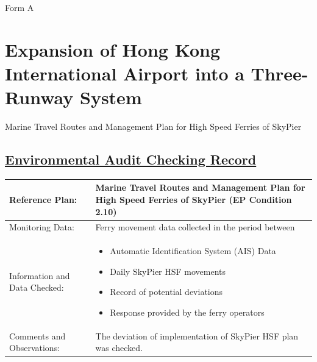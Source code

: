 \documentclass[11pt]{book}
\begin{document}
Form A

\section{Expansion of Hong Kong International Airport into a Three-Runway System}

Marine Travel Routes and Management Plan for High Speed Ferries of SkyPier

\subsection{\ul{Environmental Audit Checking Record}}

{\renewcommand{\arraystretch}{1.4}
\begin{table}[htb]
\fontsize{11pt}{15pt}\selectfont
\begin{tabular}{|>{\raggedright}p{39mm}|
p{98mm}<{\raggedright}|}\hline
Reference Plan: & Marine Travel Routes and Management Plan for High Speed Ferries of SkyPier (EP Condition 2.10)
\\[0.5mm] \hline
Monitoring Data: & Ferry movement data collected in the period between
\newline
\ul{%
\\[1.0mm] \hline
Information and Data Checked: &
\begin{minipage}[t]{110mm}
\begin{itemize}
\item Automatic Identification System (AIS) Data
\item Daily SkyPier HSF movements
\item Record of potential deviations
\item Response provided by the ferry operators
\end{itemize}
\end{minipage}
\\[0.1mm]\hline
Comments and Observations: &
The deviation of implementation of SkyPier HSF plan was checked. %
 \\ \hline
\end{tabular}
\end{table}
}
\end{document}
